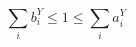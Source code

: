 \par\needspace{70pt}\begin{minipage}{\linewidth}
\begin{equation}\sum_i b_i^Y\leq1\leq\sum_i a_i^Y\label{eq:9}\end{equation}
\end{minipage}\par
